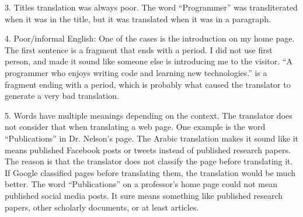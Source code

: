 3. Titles translation was always poor. The word ``Programmer'' was transliterated when it was in the title, but it was translated when it was in a paragraph.

4. Poor/informal English: One of the cases is the introduction on my home page. The first sentence is a fragment that ends with a period. I did not use first person, and made it sound like someone else is introducing me to the visitor. ``A programmer who enjoys writing code and learning new technologies.'' is a fragment ending with a period, which is probably what caused the translator to generate a very bad translation.

5. Words have multiple meanings depending on the context. The translator does not consider that when translating a web page. One example is the word ``Publications'' in Dr. Nelson's page. The Arabic translation makes it sound like it means published Facebook posts or tweets instead of published research papers. The reason is that the translator does not classify the page before translating it. If Google classified pages before translating them, the translation would be much better. The word ``Publications'' on a professor's home page could not mean published social media posts. It sure means something like published research papers, other scholarly documents, or at least articles.
